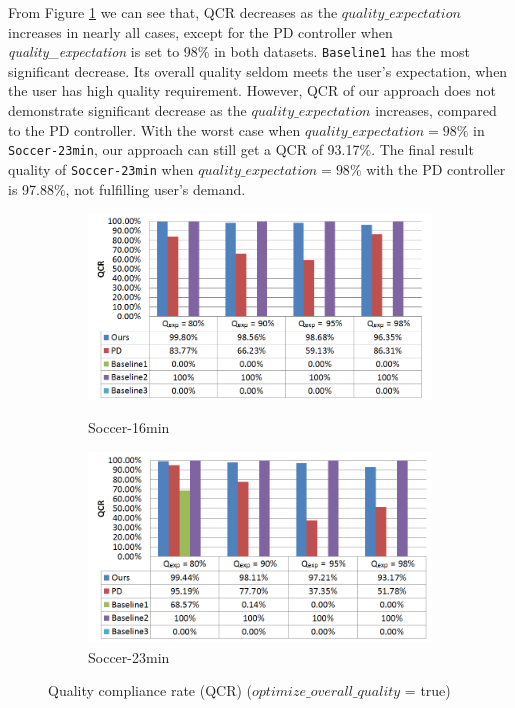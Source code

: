 \documentclass[a4paper, 11pt, twoside]{report}
\begin{document}
From Figure \ref {fig:quality-compliance-rate-overallquality} we can see that, QCR decreases as the $quality\_expectation$ increases in nearly all cases, except for the PD controller when \emph{quality\_expectation} is set to 98\% in both datasets. \texttt{Baseline1} has the most significant decrease. Its overall quality seldom meets the user's expectation, when the user has high quality requirement. However, QCR of our approach does not demonstrate significant decrease as the $quality\_expectation$ increases, compared to the PD controller. With the worst case when $quality\_expectation=98\%$ in \texttt{Soccer-23min}, our approach can still get a QCR of 93.17\%. The final result quality of \texttt{Soccer-23min} when $quality\_expectation=98\%$ with the PD controller is 97.88\%, not fulfilling user's demand.

\begin{figure}[H]
	\centering
	\begin{subfigure}[t]{5in}
		\centering
		\includegraphics[width=5in]{QCR-16min-overallquality}
		\caption{Soccer-16min}
		\hspace{5pt}
		\includegraphics[width=5in]{QCR-23min-overallquality}
		\caption{Soccer-23min}	
	\end{subfigure}
	\caption{Quality compliance rate (QCR) ($optimize\_overall\_quality$ = true)}
	\label{fig:quality-compliance-rate-overallquality}
\end{figure}
\end{document}
